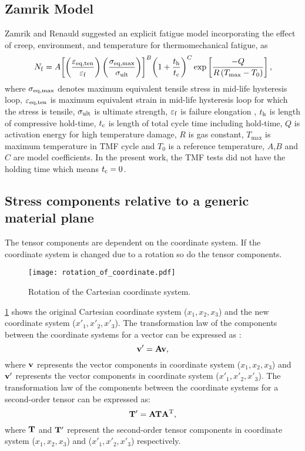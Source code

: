 \subsection{Zamrik Model}
\noindent
Zamrik and Renauld \cite{Zamrik2000} suggested an explicit fatigue model incorporating the effect of creep, environment, and temperature for thermomechanical fatigue, as
\begin{equation}
{N_{\rm f}} = A{\left[ {\left( {\frac{{{\varepsilon _{\rm eq,ten}}}}{{{\varepsilon _{\rm f}}}}} \right)\left( {\frac{{{\sigma _{\rm eq,\max }}}}{{{\sigma _{\rm{ult}}}}}} \right)} \right]^B}
{\left( {1 + \frac{{{t_{\rm{h}}}}}{{{t_{\rm{c}}}}}} \right)^C} \exp \left[ {\frac{{ - Q}}{{R\left( {{T_{\max }} - {T_0}} \right)}}} \right],
\label{Equ:Zamrik_model}
\end{equation}
where $\sigma _{\rm eq,\max }$ denotes maximum equivalent tensile stress in mid-life hysteresis loop, $\varepsilon _{\rm eq,ten}$ is maximum equivalent strain in mid-life hysteresis loop for which the stress is tensile, $\sigma _{\rm ult}$ is ultimate strength, $\varepsilon _{\rm f}$ is failure elongation , $t_{\rm{h}}$ is length of compressive hold-time, $t_{\rm{c}}$ is length of total cycle time including hold-time, $Q$ is activation energy for high temperature damage, $R$ is gas constant, $T_{\max}$ is maximum temperature in TMF cycle and $T_0$ is a reference temperature, $A$,$B$ and $C$ are model coefficients. In the present work, the TMF tests did not have the holding time which means $t_{\rm{c}}=0$.

\subsection{Stress components relative to a generic material plane}
\noindent
The tensor components are dependent on the coordinate system.
If the coordinate system is changed due to a rotation so do the tensor components.
\begin{figure}
\centering
\texttt{[image: rotation\_of\_coordinate.pdf]}
\caption{Rotation of the Cartesian coordinate system.}
\label{Fig:rotation_of_coordinate}
\end{figure}
\ref{Fig:rotation_of_coordinate} shows the original Cartesian coordinate system ($x_1,x_2,x_3$) and the new coordinate system ($x'_1,x'_2,x'_3$).
The transformation law of the components between the coordinate systems for a vector can be expressed as \cite{Chaves2013Notes}:
\begin{equation}
\bf{v'} = {\bf{A}}\bf{v},
\label{Equ:coordinate_transformation_of_vector}
\end{equation}
where $\bf{v}$ represents the vector components in coordinate system ($x_1,x_2,x_3$) and $\bf{v'}$ represents the vector components in coordinate system ($x'_1,x'_2,x'_3$).
The transformation law of the components between the coordinate systems for a second-order tensor can be expressed as:
\begin{equation}
{\bf{T'}} = {\bf{AT}}{{\bf{A}}^{\rm{T}}},
\label{Equ:coordinate_transformation_of_tensor}
\end{equation}
where $\bf{T}$ and $\bf{T'}$ represent the second-order tensor components in coordinate system ($x_1,x_2,x_3$) and ($x'_1,x'_2,x'_3$) respectively.

